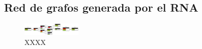 \subsection{Red de grafos generada por el RNA}

 \lipsum[1]

\begin{figure}[H]
	\centering
	\includegraphics[angle = 90, origin = c, width=0.25\textwidth]{Figuras/Graph_6}
	\centering\caption{XXXX}
\end{figure}

\lipsum[1]